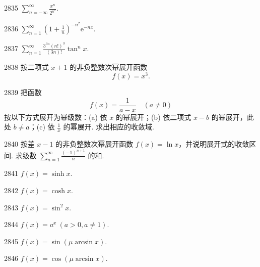 \begin{prob}[S]{2835}
$\displaystyle\sum_{n=-\infty}^{\infty} \frac{x^n}{2^{n^2}}$.
\end{prob}

\begin{prob}[S]{2836}
$\displaystyle\sum_{n=1}^{\infty} \left(1 + \frac{1}{n}\right)^{-n^2} \mathrm{e}^{-nx}$.
\end{prob}

\begin{prob}[S]{2837}
$\displaystyle\sum_{n=1}^{\infty} \frac{3^{3n}(n!)^3}{(3n)!}\tan^n x$.
\end{prob}

\begin{prob}[S]{2838}
按二项式 $x+1$ 的非负整数次幂展开函数
\[
f(x) = x^3.
\]
\end{prob}

\begin{prob}[L]{2839}
把函数
\[
f(x) = \frac{1}{a-x} \quad (a \neq 0)
\]
按以下方式展开为幂级数：(a) 依 $x$ 的幂展开；(b) 依二项式 $x-b$ 的幂展开，此处 $b \neq a$；(c) 依 $\frac{1}{x}$ 的幂展开. 求出相应的收敛域.
\end{prob}

\begin{prob}[M]{2840}
按差 $x-1$ 的非负整数次幂展开函数 $f(x) = \ln x$，并说明展开式的收敛区间. 求级数 $\displaystyle\sum_{n=1}^{\infty} \frac{(-1)^{n+1}}{n}$ 的和.
\end{prob}


\begin{prob}[S]{2841}
$f(x) = \sinh x$.
\end{prob}

\begin{prob}[S]{2842}
$f(x) = \cosh x$.
\end{prob}

\begin{prob}[S]{2843}
$f(x) = \sin^2 x$.
\end{prob}

\begin{prob}[S]{2844}
$f(x) = a^x \ (a > 0, a \neq 1)$.
\end{prob}

\begin{prob}[S]{2845}
$f(x) = \sin(\mu \arcsin x)$.
\end{prob}

\begin{prob}[S]{2846}
$f(x) = \cos(\mu \arcsin x)$.
\end{prob}

